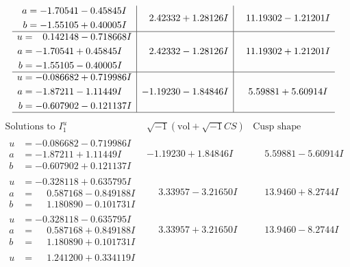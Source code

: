 \documentclass[1p]{elsarticle_modified}
\theoremstyle{definition}
\newcommand{\I}{\sqrt{-1}}
\begin{document}
$$\begin{array}{c|c|c}
\begin{aligned}
a &= -1.70541 - 0.45845 I \\
b &= -1.55105 + 0.40005 I\end{aligned}
 & \phantom{-}2.42332 + 1.28126 I & \phantom{-}11.19302 - 1.21201 I \\ \hline\begin{aligned}
u &= \phantom{-}0.142148 - 0.718668 I \\
a &= -1.70541 + 0.45845 I \\
b &= -1.55105 - 0.40005 I\end{aligned}
 & \phantom{-}2.42332 - 1.28126 I & \phantom{-}11.19302 + 1.21201 I \\ \hline\begin{aligned}
u &= -0.086682 + 0.719986 I \\
a &= -1.87211 - 1.11449 I \\
b &= -0.607902 - 0.121137 I\end{aligned}
 & -1.19230 - 1.84846 I & \phantom{-}5.59881 + 5.60914 I\\
 \hline 
 \end{array}$$\newpage$$\begin{array}{c|c|c}  
\text{Solutions to }I^u_{1}& \I (\text{vol} + \sqrt{-1}CS) & \text{Cusp shape}\\
 \hline 
\begin{aligned}
u &= -0.086682 - 0.719986 I \\
a &= -1.87211 + 1.11449 I \\
b &= -0.607902 + 0.121137 I\end{aligned}
 & -1.19230 + 1.84846 I & \phantom{-}5.59881 - 5.60914 I \\ \hline\begin{aligned}
u &= -0.328118 + 0.635795 I \\
a &= \phantom{-}0.587168 - 0.849188 I \\
b &= \phantom{-}1.180890 - 0.101731 I\end{aligned}
 & \phantom{-}3.33957 - 3.21650 I & \phantom{-}13.9460 + 8.2744 I \\ \hline\begin{aligned}
u &= -0.328118 - 0.635795 I \\
a &= \phantom{-}0.587168 + 0.849188 I \\
b &= \phantom{-}1.180890 + 0.101731 I\end{aligned}
 & \phantom{-}3.33957 + 3.21650 I & \phantom{-}13.9460 - 8.2744 I \\ \hline\begin{aligned}
u &= \phantom{-}1.241200 + 0.334119 I \\

\end{aligned}
\end{array}$$
\end{document}
